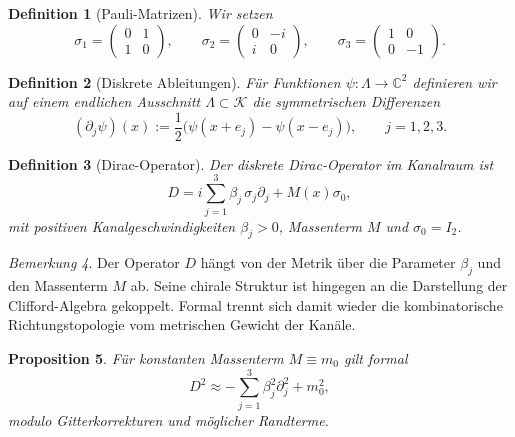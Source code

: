 \documentclass[11pt,a4paper]{article}
\newtheorem{definition}{Definition}[section]
\newtheorem{proposition}[definition]{Proposition}
\theoremstyle{remark}
\newtheorem{bemerkung}[definition]{Bemerkung}
\newcommand{\C}{\mathbb{C}}
\newcommand{\K}{\mathcal{K}}
\begin{document}
	\begin{definition}[Pauli-Matrizen]
		Wir setzen
		\begin{equation}
			\sigma_1=
			\begin{pmatrix}
				0&1\\1&0
			\end{pmatrix},
			\qquad
			\sigma_2=
			\begin{pmatrix}
				0&-i\\ i&0
			\end{pmatrix},
			\qquad
			\sigma_3=
			\begin{pmatrix}
				1&0\\0&-1
			\end{pmatrix}.
		\end{equation}
	\end{definition}
	
	\begin{definition}[Diskrete Ableitungen]
		Für Funktionen $\psi:\Lambda\to\C^2$ definieren wir auf einem endlichen Ausschnitt $\Lambda\subset\K$ die symmetrischen Differenzen
		\begin{equation}
			(\partial_j\psi)(x):=\frac{1}{2}\bigl(\psi(x+e_j)-\psi(x-e_j)\bigr),\qquad j=1,2,3.
		\end{equation}
	\end{definition}
	
	\begin{definition}[Dirac-Operator]
		Der diskrete Dirac-Operator im Kanalraum ist
		\begin{equation}
			D = i\sum_{j=1}^3 \beta_j\,\sigma_j\partial_j + M(x)\sigma_0,
		\end{equation}
		mit positiven Kanalgeschwindigkeiten $\beta_j>0$, Massenterm $M$ und $\sigma_0=I_2$.
	\end{definition}
	
	\begin{bemerkung}
		Der Operator $D$ hängt von der Metrik über die Parameter $\beta_j$ und den Massenterm $M$ ab. Seine chirale Struktur ist hingegen an die Darstellung der Clifford-Algebra gekoppelt. Formal trennt sich damit wieder die kombinatorische Richtungstopologie vom metrischen Gewicht der Kanäle.
	\end{bemerkung}
	
	\begin{proposition}
		Für konstanten Massenterm $M\equiv m_0$ gilt formal
		\begin{equation}
			D^2 \approx -\sum_{j=1}^3 \beta_j^2\partial_j^2 + m_0^2,
		\end{equation}
		modulo Gitterkorrekturen und möglicher Randterme.
	\end{proposition}
	
\end{document}
